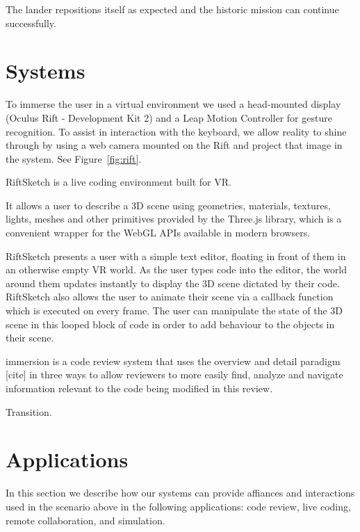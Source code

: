 \documentclass[conference]{IEEEtran}
\begin{document}
The lander repositions itself as expected and the historic mission can continue successfully.
  

\section{Systems}

To immerse the user in a virtual environment we used a head-mounted display (Oculus Rift - Development Kit 2) and a Leap Motion Controller for gesture recognition.
To assist in interaction with the keyboard, we allow reality to shine through by using a web camera mounted on the Rift and project that image in the system.
See Figure~\ref{fig:rift}.

RiftSketch is a live coding environment built for VR.

It allows a user to describe a 3D scene using geometries, materials, textures, lights, meshes and other primitives provided by the Three.js library, which is a convenient wrapper for the WebGL APIs available in modern browsers. 

RiftSketch presents a user with a simple text editor, floating in front of them in an otherwise empty VR world. 
As the user types code into the editor, the world around them updates instantly to display the 3D scene dictated by their code. 
RiftSketch also allows the user to animate their scene via a callback function which is executed on every frame. 
The user can manipulate the state of the 3D scene in this looped block of code in order to add behaviour to the objects in their scene.

immersion is a code review system that uses the overview and detail paradigm [cite] in three ways to allow reviewers to more easily find, analyze and navigate information relevant to the code being modified in this review.

Transition.


\section{Applications}

In this section we describe how our systems can provide affiances and interactions used in the scenario above in the following applications:
code review, live coding, remote collaboration, and simulation. 

  
\end{document}
